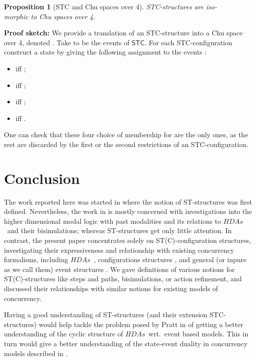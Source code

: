 \documentclass[submission,copyright,creativecommons]{eptcs}
\newtheorem{proposition}[theorem]{Proposition}
\newenvironment{proof}[1][\!\!\,]{\vspace{1ex}\noindent\textbf{Proof #1: }}{\hfill\vspace{2ex}}
\newcommand\HDAs{\ensuremath{\mathit{HDAs}}}
\newcommand\STC{\ensuremath{\mathsf{STC}}}
\begin{document}
\begin{proposition}[STC and Chu spaces over 4]\label{prop_STC_Chu4}
STC-structures are {iso}-\\{morphic} to \emph{Chu spaces over 4}.
\end{proposition}

\begin{proof}[sketch]
We provide a translation of an STC-structure into a Chu space over 4, denoted . Take  to be the events of \STC. For each STC-configuration  construct a state  by giving the following assignment to the events :
\begin{itemize}
\item  iff ;
\item  iff ;
\item  iff ;
\item  iff .
\end{itemize}
One can check that these four choice of membership for  are the only ones, as the rest are discarded by the first or the second restrictions of an STC-configuration.
\end{proof}




\section{Conclusion}\label{sec_conclusion}

The work reported here was started in \cite{P12turing} where the notion of ST-structures was first defined. Nevertheless, the work in \cite{P12turing} is mostly concerned with investigations into the higher dimensional modal logic with past modalities and its relations to \HDAs\ and their bisimulations; whereas ST-structures get only little attention. In contrast, the present paper concentrates solely on ST(C)-configuration structures, investigating their expressiveness and relationship with existing concurrency formalisms, including \HDAs\ \cite{pratt91hda,Glabbeek06HDA}, configurations structures \cite{GlabbeekP95config,GlabbeekG01refinement}, and general (or inpure as we call them) event structures \cite{GlabbeekP09configStruct}. We gave definitions of various notions for ST(C)-structures like steps and paths, bisimulations, or action refinement, and discussed their relationships with similar notions for existing models of concurrency.

Having a good understanding of ST-structures (and their extension STC-structures) would help tackle the problem posed by Pratt in \cite{Pratt00HDArev} of getting a better understanding of the cyclic structure of \HDAs\ wrt.\ event based models. This in turn would give a better understanding of the state-event duality in concurrency models described in \cite{Pratt02duality,Pratt03trans_cancel}.
\end{document}
